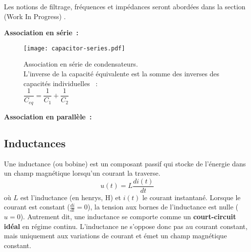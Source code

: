 \begin{Note}
	Les notions de filtrage, fr\'equences et imp\'edances seront abord\'ees dans la section (Work In Progress) .
\end{Note}
\textbf{Association en s\'erie~:}
\begin{figure}[H]
    \centering
    \texttt{[image: capacitor-series.pdf]}
    \caption{\centering
    Association en s\'erie de condensateurs.\\
    L'inverse de la capacit\'e \'equivalente est la somme des inverses des capacit\'es individuelles
    ~:\\
    \vspace{\baselineskip}
    \(\dfrac{1}{C_{eq}} = \dfrac{1}{C_1} + \dfrac{1}{C_2}\)}
\end{figure}
\textbf{Association en parall\`ele~:}
\begin{figure}[H]
\end{figure}

\subsection{Inductances} \label{subsec:inductors}
Une inductance (ou bobine) est un composant passif qui stocke de l'\'energie dans un champ magn\'etique lorsqu'un courant la traverse.
\[
u(t) = L \frac{di(t)}{dt}
\]
où \(L\) est l'inductance (en henrys, \unit{\henry}) et \(i(t)\) le courant instantan\'e.
\vspace{\baselineskip}
Lorsque le courant est constant (\(\frac{di}{dt} = 0\)), la tension aux bornes de l'inductance est nulle (\(u = 0\)). Autrement dit, une inductance se comporte comme un \textbf{court-circuit id\'eal} en r\'egime continu. L'inductance ne s'oppose donc pas au courant constant, mais uniquement aux variations de courant et \'emet un champ magn\'etique constant.

